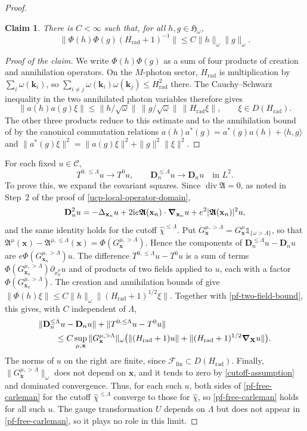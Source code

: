 \documentclass[final,reqno]{amsart}
\DeclareMathOperator{\div}{div}
\newtheorem*{claim}{Claim}
\theoremstyle{remark}
\newcommand{\iden}{\mathbb{1}}
\renewcommand{\i}{\mathrm{i}}
\newcommand{\dua}[2]{\langle #1, #2 \rangle}
\newcommand{\DC}{D}
\newcommand{\AF}{\bm{\mathfrak{A}}}
\newcommand{\Af}{\mathfrak{A}}
\newcommand{\rad}{\mathrm{rad}}
\newcommand{\Fock}{\mathcal{F}}
\newcommand{\Hil}{\mathfrak{H}}
\newcommand{\vk}{\mathbf{k}}
\newcommand{\vx}{\mathbf{x}}
\newcommand{\vX}{{\mathbf{X}}}
\newcommand{\vD}{{\mathbf{D}}}
\newcommand{\wh}[1]{\widehat{#1}}
\begin{document}
\begin{proof}
\begin{claim}
There is $C<\infty$ such that, for all $h,g\in\Hil_\omega$,
\begin{equation}\label{pf-two-field-bound}
 \|\varPhi(h)\varPhi(g)(H_\rad+1)^{-1}\|
 \leq C\|h\|_\omega\|g\|_\omega.
\end{equation}
\end{claim}

\begin{proof}[Proof of the claim]
We write $\varPhi(h)\varPhi(g)$ as a sum of four products of creation
and annihilation operators.  On the $M$-photon sector, $H_\rad$ is
multiplication by $\sum_i\omega(\vk_i)$, so
$\sum_{i\neq j}\omega(\vk_i)\omega(\vk_j)\leq H_\rad^2$ there.  The
Cauchy--Schwarz inequality in the two annihilated photon variables
therefore gives
\[
 \|a(h)a(g)\xi\|\leq\|h/\sqrt\omega\|\,\|g/\sqrt\omega\|\,\|H_\rad\xi\|,
 \qquad \xi\in\DC(H_\rad).
\]
The other three products reduce to this estimate and to the
annihilation bound of \cite[Section~3.3]{Q} by the canonical
commutation relations $a(h)a^*(g)=a^*(g)a(h)+\dua{h}{g}$ and
$\|a^*(g)\xi\|^2=\|a(g)\xi\|^2+\|g\|^2\|\xi\|^2$.
\end{proof}

For each fixed $u\in\mathcal C$,
\[
 T^{0,\le\Lambda}u\longrightarrow T^0u,
 \qquad \vD_n^{\le\Lambda}u\longrightarrow\vD_nu
 \quad\text{in }L^2.
\]
To prove this, we expand the covariant squares.  Since $\div\AF=0$, as
noted in Step~2 of the proof of \cref{ucp-local-operator-domain},
\[
 \vD_n^2u=-\Delta_{\vx_n}u+2\i e\AF(\vx_n)\cdot\grad_{\vx_n}u
          +e^2|\AF(\vx_n)|^2u,
\]
and the same identity holds for the cutoff $\wh\chi^{\le\Lambda}$.
Put $G^{\mu,>\Lambda}_\vx=G^\mu_\vx\iden_{\{\omega>\Lambda\}}$, so that
$\Af^\mu(\vx)-\Af^{\mu,\le\Lambda}(\vx)=\varPhi(G^{\mu,>\Lambda}_\vx)$.
Hence the components of $\vD_n^{\le\Lambda}u-\vD_nu$ are
$e\varPhi(G^{\mu,>\Lambda}_{\vx_n})u$.  The difference
$T^{0,\le\Lambda}u-T^0u$ is a sum of terms
$\varPhi(G^{\mu,>\Lambda}_{\vx_n})\partial_{x_n^\mu}u$ and of products of
two fields applied to $u$, each with a factor
$\varPhi(G^{\mu,>\Lambda}_{\vx_n})$.  The creation and annihilation bounds
of \cite[Section~3.3]{Q} give
$\|\varPhi(h)\xi\|\leq C\|h\|_\omega\|(H_\rad+1)^{1/2}\xi\|$.  Together
with \cref{pf-two-field-bound}, this gives, with $C$ independent of
$\Lambda$,
\[
 \begin{split}
 &\|\vD_n^{\le\Lambda}u-\vD_nu\|+\|T^{0,\le\Lambda}u-T^0u\|\\
 &\qquad\leq C\sup_{\mu,\vx}\|G^{\mu,>\Lambda}_\vx\|_\omega
   \bigl(\|(H_\rad+1)u\|+\|(H_\rad+1)^{1/2}\grad_\vX u\|\bigr).
 \end{split}
\]
The norms of $u$ on the right are finite, since
$\Fock_{\mathrm{fin}}\subset\DC(H_\rad)$.  Finally,
$\|G^{\mu,>\Lambda}_\vx\|_\omega$ does not depend on $\vx$, and it tends to
zero by \cref{cutoff-assumption} and dominated convergence.
Thus, for each such $u$, both sides of \cref{pf-free-carleman} for the
cutoff $\wh\chi^{\le\Lambda}$ converge to those for $\wh\chi$, so
\cref{pf-free-carleman} holds for all such $u$.  The gauge
transformation $U$ depends on $\Lambda$ but does not appear in
\cref{pf-free-carleman}, so it plays no role in this limit.


\end{proof}
\end{document}
